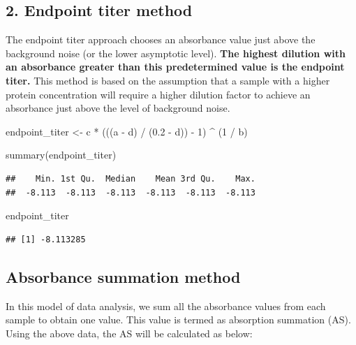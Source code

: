 \documentclass[
]{book}
\newenvironment{Shaded}{\begin{snugshade}}{\end{snugshade}}
\newcommand{\DecValTok}[1]{\textcolor[rgb]{0.00,0.00,0.81}{#1}}
\newcommand{\FloatTok}[1]{\textcolor[rgb]{0.00,0.00,0.81}{#1}}
\newcommand{\FunctionTok}[1]{\textcolor[rgb]{0.00,0.00,0.00}{#1}}
\newcommand{\NormalTok}[1]{#1}
\newcommand{\OtherTok}[1]{\textcolor[rgb]{0.56,0.35,0.01}{#1}}
\newcommand{\SpecialCharTok}[1]{\textcolor[rgb]{0.00,0.00,0.00}{#1}}
\begin{document}
\hypertarget{endpoint-titer-method}{%
\subsection{2. Endpoint titer method}\label{endpoint-titer-method}}

The endpoint titer approach chooses an absorbance value just above the background noise (or the lower asymptotic level). \textbf{The highest dilution with an absorbance greater than this predetermined value is the endpoint titer.} This method is based on the assumption that a sample with a higher protein concentration will require a higher dilution factor to achieve an absorbance just above the level of background noise.

\begin{Shaded}
\begin{Highlighting}[]
\NormalTok{endpoint\_titer }\OtherTok{\textless{}{-}}\NormalTok{ c }\SpecialCharTok{*}\NormalTok{ (((a }\SpecialCharTok{{-}}\NormalTok{ d) }\SpecialCharTok{/}\NormalTok{ (}\FloatTok{0.2} \SpecialCharTok{{-}}\NormalTok{ d)) }\SpecialCharTok{{-}} \DecValTok{1}\NormalTok{) }\SpecialCharTok{\^{}}\NormalTok{ (}\DecValTok{1} \SpecialCharTok{/}\NormalTok{ b)}

\FunctionTok{summary}\NormalTok{(endpoint\_titer)}
\end{Highlighting}
\end{Shaded}

\begin{verbatim}
##    Min. 1st Qu.  Median    Mean 3rd Qu.    Max. 
##  -8.113  -8.113  -8.113  -8.113  -8.113  -8.113
\end{verbatim}

\begin{Shaded}
\begin{Highlighting}[]
\NormalTok{endpoint\_titer}
\end{Highlighting}
\end{Shaded}

\begin{verbatim}
## [1] -8.113285
\end{verbatim}

\hypertarget{absorbance-summation-method}{%
\subsection{Absorbance summation method}\label{absorbance-summation-method}}

In this model of data analysis, we sum all the absorbance values from each sample to obtain one value. This value is termed as absorption summation (AS). Using the above data, the AS will be calculated as below:
\end{document}
